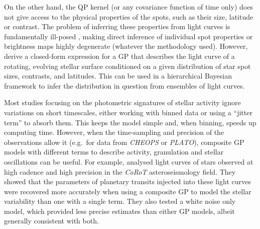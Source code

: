 \documentclass[letterpaper]{ar-1col}
\begin{document}
On the other hand, the QP kernel (or any covariance function of time only) does not give access to the physical properties of the spots, such as their size, latitude or contrast. The problem of inferring these properties from light curves is fundamentally ill-posed \citep{2021AJ....162..123L}, making direct inference of individual spot properties or brightness maps highly degenerate (whatever the methodology used). However, \citet{2021AJ....162..124L} derive a closed-form expression for a GP that describes the light curve of a rotating, evolving stellar surface conditioned on a given distribution of star spot sizes, contrasts, and latitudes. This can be used in a hierarchical Bayesian framework to infer the distribution in question from ensembles of light curves.

Most studies focusing on the photometric signatures of stellar activity ignore variations on short timescales, either working with binned data or using a ``jitter term'' to absorb them. This keeps the model simple and, when binning, speeds up computing time. However, when the time-sampling and precision of the observations allow it (e.g.\ for data from \textit{CHEOPS} or \textit{PLATO}), composite GP models with different terms to describe activity, granulation and stellar oscillations can be useful. For example, \citet{2020A&A...634A..75B} analysed light curves of stars observed at high cadence and high precision in the \textit{CoRoT} asteroseismology field. They showed that the parameters of planetary transits injected into these light curves were recovered more accurately when using a composite GP to model the stellar variability than one with a single term. They also tested a white noise only model, which provided less precise estimates than either GP models, albeit generally consistent with both.
\end{document}
